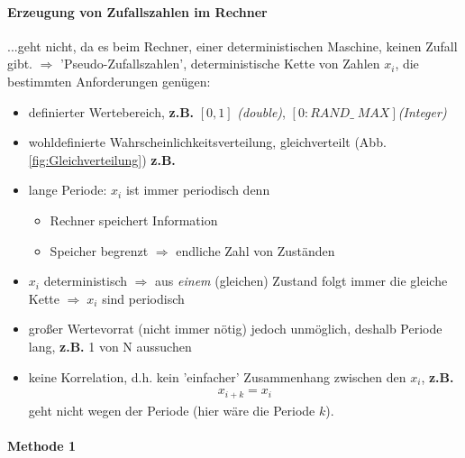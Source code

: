 \documentclass[12pt]{article}
\begin{document}
\paragraph{Erzeugung von Zufallszahlen im Rechner}
...geht nicht, da es beim Rechner, einer deterministischen Maschine, keinen Zufall gibt. $\Rightarrow$ 'Pseudo-Zufallszahlen', deterministische Kette von Zahlen $x_i$, die bestimmten Anforderungen genügen: 
\begin{itemize}
\item definierter Wertebereich, \textbf{z.B.} $ [ 0,1] $ \textit{(double)}, $[ 0: RAND\_ \; MAX]$\textit{(Integer)}
\item wohldefinierte Wahrscheinlichkeitsverteilung, gleichverteilt (Abb. \ref{fig:Gleichverteilung}) \textbf{ z.B.} %
\item lange Periode: $x_i$ ist immer periodisch denn
\begin{itemize}
\item Rechner speichert Information
\item Speicher begrenzt $\Rightarrow$ endliche Zahl von Zuständen
\end{itemize}
\item $x_i$ deterministisch $\Rightarrow$ aus \textit{einem} (gleichen) Zustand folgt immer die gleiche Kette $\Rightarrow \; x_i$ sind periodisch
\item großer Wertevorrat (nicht immer nötig) jedoch unmöglich, deshalb Periode lang,\textbf{ z.B.} 1 von N %
aussuchen
\item keine Korrelation, d.h. kein 'einfacher' Zusammenhang zwischen den $x_i$, \textbf{ z.B.}
\begin{align*}
x_{i+k} = x_i 
\end{align*}
geht nicht wegen der Periode (hier wäre die Periode $k$).
\end{itemize}
\paragraph{Methode 1} 
\end{document}
